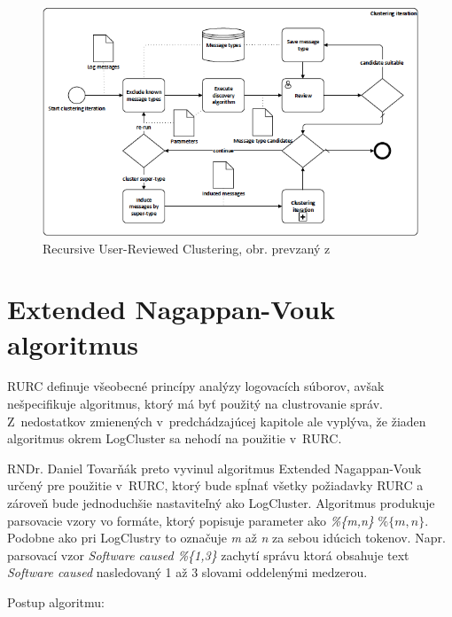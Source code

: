 \begin{figure}[htbp]
 \centering 
 \begin{minipage}{\linewidth}
 	\centering
 	\includegraphics[width=\textwidth]{images/RURC.png} 	
 \end{minipage}
  \caption{Recursive User-Reviewed Clustering, obr. prevzaný z~\parencite{Tovarnak2017}}
  \label{fig:rurc}
\end{figure}


\section{Extended Nagappan-Vouk algoritmus}
\label{sec:eng}
RURC definuje všeobecné princípy analýzy logovacích súborov, avšak nešpecifikuje algoritmus, ktorý má byť použitý na clustrovanie správ.
Z~nedostatkov zmienených v~predchádzajúcej kapitole ale vyplýva, že žiaden algoritmus okrem LogCluster sa nehodí na použitie v~RURC.
\par RNDr. Daniel Tovarňák preto vyvinul algoritmus Extended Na\-gappan-Vouk určený pre použitie v~RURC, ktorý bude spĺnať všetky požiadavky RURC a zároveň bude jednoduchšie nastaviteľný ako LogCluster. Algoritmus produkuje parsovacie vzory vo formáte, ktorý popisuje parameter ako \emph{\%\{m,n\}} $\%\{m,n\}$. Podobne ako pri LogClustry to označuje \emph{m} až \emph{n} za sebou idúcich tokenov. Napr. parsovací vzor \emph{Software caused \%\{1,3\}} zachytí správu ktorá obsahuje text \emph{Software caused} nasledovaný 1 až 3 slovami oddelenými medzerou. \newpage \par Postup algoritmu:


